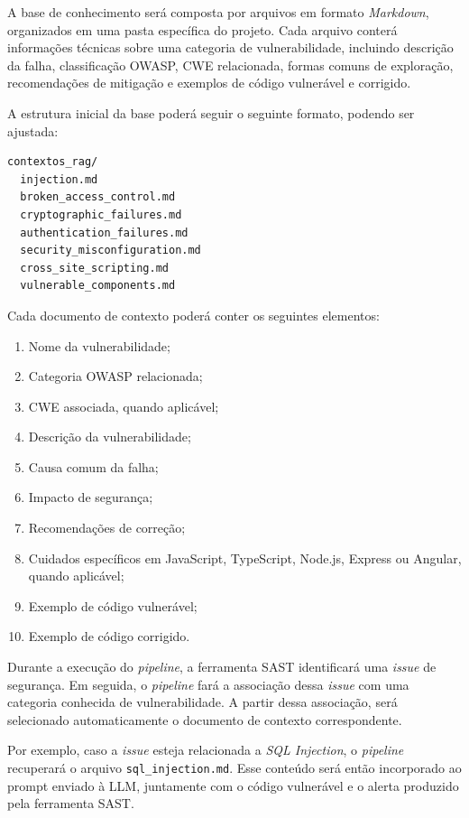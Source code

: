A base de conhecimento será composta por arquivos em formato \textit{Markdown}, organizados em uma pasta específica do projeto. Cada arquivo conterá informações técnicas sobre uma categoria de vulnerabilidade, incluindo descrição da falha, classificação OWASP, CWE relacionada, formas comuns de exploração, recomendações de mitigação e exemplos de código vulnerável e corrigido.

A estrutura inicial da base poderá seguir o seguinte formato, podendo ser ajustada:

\begin{verbatim}
contextos_rag/
  injection.md
  broken_access_control.md
  cryptographic_failures.md
  authentication_failures.md
  security_misconfiguration.md
  cross_site_scripting.md
  vulnerable_components.md
\end{verbatim}

Cada documento de contexto poderá conter os seguintes elementos:

\begin{enumerate}
    \item Nome da vulnerabilidade;
    \item Categoria OWASP relacionada;
    \item CWE associada, quando aplicável;
    \item Descrição da vulnerabilidade;
    \item Causa comum da falha;
    \item Impacto de segurança;
    \item Recomendações de correção;
    \item Cuidados específicos em JavaScript, TypeScript, Node.js, Express ou Angular, quando aplicável;
    \item Exemplo de código vulnerável;
    \item Exemplo de código corrigido.
\end{enumerate}

Durante a execução do \textit{pipeline}, a ferramenta SAST identificará uma \textit{issue} de segurança. Em seguida, o \textit{pipeline} fará a associação dessa \textit{issue} com uma categoria conhecida de vulnerabilidade. A partir dessa associação, será selecionado automaticamente o documento de contexto correspondente.

Por exemplo, caso a \textit{issue} esteja relacionada a \textit{SQL Injection}, o \textit{pipeline} recuperará o arquivo \texttt{sql\_injection.md}. Esse conteúdo será então incorporado ao prompt enviado à LLM, juntamente com o código vulnerável e o alerta produzido pela ferramenta SAST.

